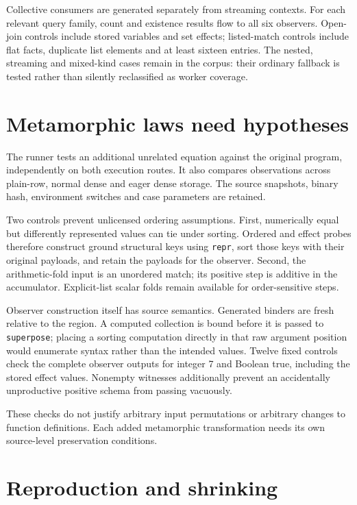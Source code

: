 \documentclass[11pt,a4paper]{article}
\newcommand{\code}[1]{\nolinkurl{#1}}
\begin{document}
Collective consumers are generated separately from streaming contexts.
For each relevant query family, count and existence results flow to all six
observers. Open-join controls include stored variables and set effects;
listed-match controls include flat facts, duplicate list elements and at
least sixteen entries. The nested, streaming and mixed-kind cases remain
in the corpus: their ordinary fallback is tested rather than silently
reclassified as worker coverage.

\section{Metamorphic laws need hypotheses}

The runner tests an additional unrelated equation against the original
program, independently on both execution routes. It also compares observations
across plain-row, normal dense and eager dense storage. The source snapshots,
binary hash, environment switches and case parameters are retained.

Two controls prevent unlicensed ordering assumptions. First, numerically equal
but differently represented values can tie under sorting. Ordered and effect
probes therefore construct ground structural keys using \code{repr}, sort
those keys with their original payloads, and retain the payloads for the
observer. Second, the arithmetic-fold input is an unordered match; its positive
step is additive in the accumulator. Explicit-list scalar folds remain
available for order-sensitive steps.

Observer construction itself has source semantics. Generated binders are fresh
relative to the region. A computed collection is bound before it is passed
to \code{superpose}; placing a sorting computation directly in that raw
argument position would enumerate syntax rather than the intended values.
Twelve fixed controls check the complete observer outputs for integer 7 and
Boolean true, including the stored effect values. Nonempty witnesses additionally
prevent an accidentally unproductive positive schema from passing vacuously.

These checks do not justify arbitrary input permutations or arbitrary changes
to function definitions. Each added metamorphic transformation needs its own
source-level preservation conditions.

\section{Reproduction and shrinking}
\end{document}

